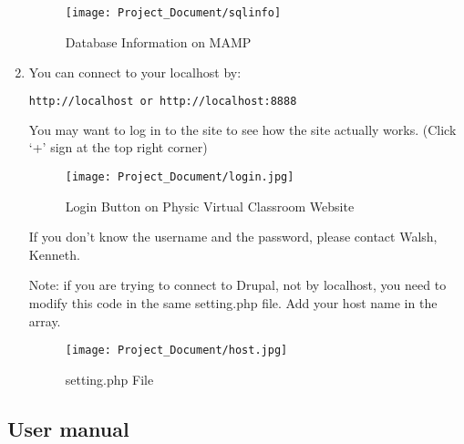 \documentclass[10pt]{article}
\begin{document}
\begin{enumerate}
                    \begin{figure}[!ht]
                           \centering
                           \texttt{[image: Project\_Document/sqlinfo]}
                        \caption{Database Information on MAMP}
                    \end{figure}

            \item You can connect to your localhost by:

\begin{lstlisting}[language=bash]
http://localhost or http://localhost:8888
\end{lstlisting}

            You may want to log in to the site to see how the site actually works. (Click `+' sign at the top right corner)

                \begin{figure}[!ht]
                       \centering
                         \texttt{[image: Project\_Document/login.jpg]}
                    \caption{Login Button on Physic Virtual Classroom Website}
                \end{figure}
\newpage
            If you don’t know the username and the password, please contact Walsh, Kenneth.

            Note: if you are trying to connect to Drupal, not by localhost, you need to modify this code in the same setting.php file. Add your host name in the array.

                \begin{figure}[!ht]
                       \centering
                       \texttt{[image: Project\_Document/host.jpg]}
                    \caption{setting.php File}
                \end{figure}
        \end{enumerate}

    \subsection{User manual}
\end{document}
